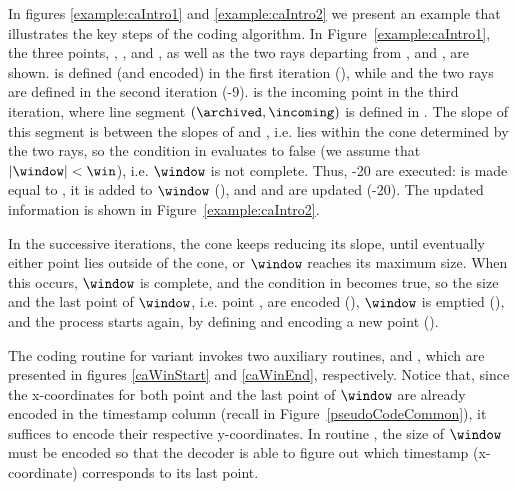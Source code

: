 In figures \ref{example:caIntro1} and \ref{example:caIntro2} we present an example that illustrates the key steps of the coding algorithm. In Figure~\ref{example:caIntro1}, the three points, \incoming, \archived, and \snapshot, as well as the two rays departing from \archived, \smin and \smax, are shown. \archived is defined (and encoded) in the first iteration (), while \snapshot and the two rays are defined in the second iteration (-9). \incoming is the incoming point in the third iteration, where line segment $(\archived, \incoming)$ is defined in . The slope of this segment is between the slopes of \smin and \smax, i.e. \incoming lies within the cone determined by the two rays, so the condition in  evaluates to false (we assume that $|\window|<\win$), i.e. $\window$ is not complete. Thus, -20 are executed: \snapshot is made equal to \incoming, it is added to $\window$ (), and \smin and \smax are updated (-20). The updated information is shown in Figure~\ref{example:caIntro2}. 


\vspace{+5pt}
\exampleCA


\vspace{+5pt}
In the successive iterations, the cone keeps reducing its slope, until eventually either point \incoming lies outside of the cone, or $\window$ reaches its maximum size. When this occurs, $\window$ is complete, and the condition in  becomes true, so the size and the last point of $\window$, i.e. point \snapshot, are encoded (), $\window$ is emptied (), and the process starts again, by defining and encoding a new point \archived ().


\vspace{+5pt}
The coding routine for variant \maskalgo invokes two auxiliary routines, \CAWinStart and \CAWinEnd, which are presented in figures \ref{caWinStart} and \ref{caWinEnd}, respectively. Notice that, since the x-coordinates for both point \archived and the last point of $\window$ are already encoded in the timestamp column (recall  in Figure~\ref{pseudoCodeCommon}), it suffices to encode their respective y-coordinates. In routine \CAWinEnd, the size of $\window$ must be encoded so that the decoder is able to figure out which timestamp (x-coordinate) corresponds to its last point.


\clearpage




